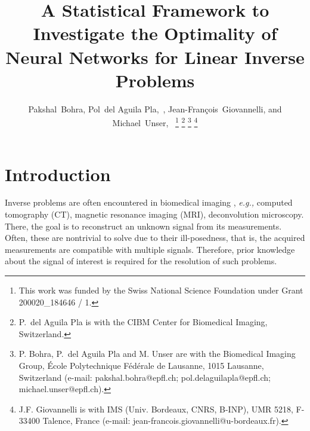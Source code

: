 \documentclass[journal]{IEEEtran}
\begin{document}
\IEEEoverridecommandlockouts


\title{A Statistical Framework to Investigate the Optimality of Neural Networks for Linear Inverse Problems}

\author{Pakshal~Bohra, Pol~{del Aguila Pla},~,
Jean-Fran\c{c}ois~Giovannelli, and Michael~Unser,~
\thanks{This work was funded by the Swiss National Science Foundation under
Grant 200020\_184646 / 1.}
\thanks{P.~{del Aguila Pla} is with the CIBM Center for Biomedical Imaging,
Switzerland.}
\thanks{P. Bohra, P.~{del Aguila Pla} and M. Unser are with the Biomedical
Imaging Group, \'{E}cole Polytechnique F\'{e}d\'{e}rale de Lausanne, 1015
Lausanne, Switzerland (e-mail: pakshal.bohra@epfl.ch;
pol.delaguilapla@epfl.ch; michael.unser@epfl.ch).}
\thanks{J.F. Giovannelli is with IMS (Univ. Bordeaux, CNRS, B-INP), UMR 5218,
F-33400 Talence, France (e-mail: jean-francois.giovannelli@u-bordeaux.fr).
}}%








\maketitle

\begin{abstract}
    
\end{abstract}
\begin{IEEEkeywords}
    
\end{IEEEkeywords}



\section{Introduction}\label{sec:intro}
Inverse problems are often encountered in biomedical imaging \cite{unser2019biomedical}, \textit{e.g.,} computed tomography (CT), magnetic resonance imaging (MRI), deconvolution microscopy. There, the goal is to reconstruct an unknown signal from its measurements. Often, these are nontrivial to solve due to their ill-posedness, that is, the acquired measurements are compatible with multiple signals. Therefore, prior knowledge about the signal of interest is required for the resolution of such problems.
\end{document}
